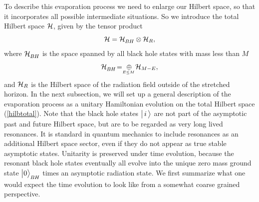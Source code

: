 \documentclass[12pt]{article}%
\def\be{\begin{equation}}
\def\ee{\end{equation}}
\begin{document}
To describe this evaporation process we need to enlarge our Hilbert space, so that it incorporates all possible intermediate situations. So we introduce the total Hilbert space $\cal H$, given by the tensor product
\be
\label{hilbtotal}
{\cal H} = {\cal H}_\BH \otimes {\cal H}_R,
\ee
where ${\cal H}_\BH$ is the space spanned by all black hole states with mass less than $M$
\be
\label{bhilb}
 {\cal H}_\BH \! =\ \oplus_{\strut \!\!\!\!\!\!\!\!\!\!{}_{E\leq M}}{\cal H}_{M-E},
\ee 
and  ${\cal H}_R$ is the Hilbert space of the radiation field outside of the stretched horizon. 
 In the next subsection, we will set up a general description of the
evaporation process as a unitary Hamiltonian evolution on the total Hilbert space (\ref{hilbtotal}). 
Note that the black hole states $\bigl|\, i\,\bigr\rangle$ 
are not part of the asymptotic past and future Hilbert space, but are to be regarded as very long lived resonances.  It is standard in quantum mechanics to include resonances as an additional
 Hilbert space sector, even if they do not appear as true stable asymptotic states. 
 Unitarity is preserved under time evolution, because the resonant black hole states eventually all evolve
into the unique zero mass ground state $\bigl| 0 \ra_\BH$ times an asymptotic radiation state.
 We first summarize what one would expect the time evolution to look 
like from a somewhat coarse grained perspective.
\end{document}
